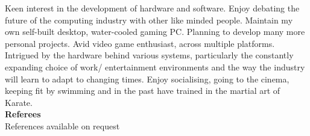 \documentclass[a4paper,12pt,final,sans]{memoir}
\begin{document}
Keen interest in the development of hardware and software. 
Enjoy debating the future of the computing industry with other like minded people. 
Maintain my own self-built desktop, water-cooled gaming PC. 
Planning to develop many more personal projects. 
Avid video game enthusiast, across multiple platforms. \\[-0.5em]

Intrigued by the hardware behind various systems, particularly the constantly expanding choice of work/ entertainment environments and the way the industry will learn to adapt to changing times.
Enjoy socialising, going to the cinema, keeping fit by swimming and in the past have trained in the martial art of Karate.\\[-0.5mm]


\textbf{\textsf{\color{head} \large{Referees} }}\\[-0.9em]

References available on request


\end{document}
